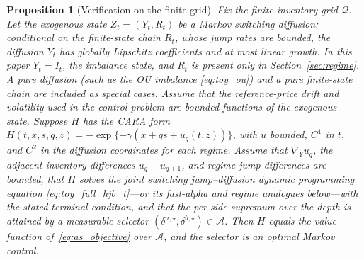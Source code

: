 \documentclass[11pt,a4paper]{article}
\newcommand{\Qcal}{\mathcal{Q}}
\newcommand{\Acal}{\mathcal{A}}
\theoremstyle{plain}
\newtheorem{proposition}{Proposition}[section]
\theoremstyle{definition}
\begin{document}
\begin{proposition}[Verification on the finite grid]
\label{prop:verification}
Fix the finite inventory grid \(\Qcal\).  Let the exogenous state
\(Z_t=(Y_t,R_t)\) be a Markov switching diffusion: conditional on the
finite-state chain \(R_t\), whose jump rates are bounded, the diffusion \(Y_t\)
has globally Lipschitz coefficients and at most linear growth.  In this paper
\(Y_t=I_t\), the imbalance state, and \(R_t\) is present only in
Section~\ref{sec:regime}.  A pure
diffusion (such as the OU imbalance \eqref{eq:toy_ou}) and a pure finite-state
chain are included as special cases.  Assume that the reference-price drift
and volatility used in the control problem are bounded functions of the
exogenous state.  Suppose \(H\) has the CARA form
\(H(t,x,s,q,z)=-\exp\{-\gamma(x+qs+u_q(t,z))\}\), with \(u\) bounded,
\(C^1\) in \(t\), and \(C^2\) in the diffusion coordinates for each regime.
Assume that \(\nabla_Yu_q\), the adjacent-inventory differences
\(u_q-u_{q\pm1}\), and regime-jump differences are bounded, that \(H\) solves
the joint switching jump--diffusion dynamic programming equation
\eqref{eq:toy_full_hjb_t}---or its fast-alpha and regime
analogues below---with the stated terminal condition, and that the per-side
supremum over the depth is attained by a measurable selector
\((\delta^{a,\star},\delta^{b,\star})\in\Acal\).  Then \(H\) equals the value
function of~\eqref{eq:as_objective} over \(\Acal\), and the selector is an
optimal Markov control.
\end{proposition}
\end{document}
